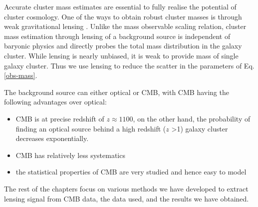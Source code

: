 Accurate cluster mass estimates are essential to fully realise the potential of cluster cosmology.
One of the ways to obtain robust cluster masses is through weak gravitational lensing \citep{becker10}. 
Unlike the mass observable scaling relation, cluster mass estimation through lensing of a background source is independent of baryonic physics and directly probes the total mass distribution in the galaxy cluster. 
While lensing is nearly unbiased, it is weak to provide mass of single galaxy cluster. Thus we use lensing to reduce the scatter in the parameters of Eq. \ref{obs-mass}.

The background source can either optical or CMB, with CMB having the following advantages over optical:
\begin{itemize}
\item CMB is at precise redshift of $z \approx 1100$, on the other hand, the probability of finding an optical source behind a high redshift ($z$ >1) galaxy cluster decreases exponentially.
\item CMB has relatively less systematics
\item the statistical properties of CMB are very studied and hence easy to model
\end{itemize}
The rest of the chapters focus on various methods we have developed to extract lensing signal from CMB data, the data used, and the results we have obtained. 



  

 

 
 

   